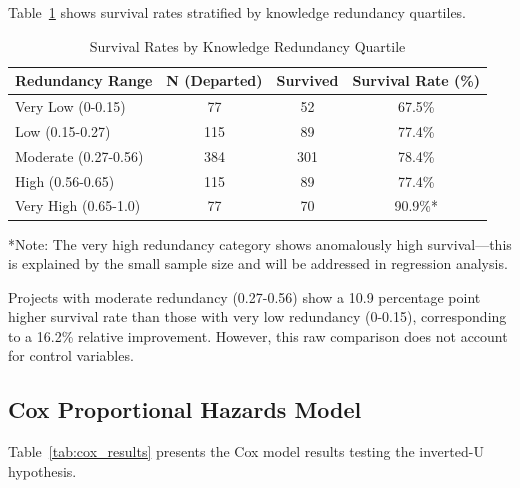 \documentclass[11pt,letterpaper]{article}
\begin{document}
Table~\ref{tab:survival_rates} shows survival rates stratified by knowledge redundancy quartiles.

\begin{table}[!htbp]
\centering
\caption{Survival Rates by Knowledge Redundancy Quartile}
\label{tab:survival_rates}
\begin{tabular}{lccc}
\toprule
\textbf{Redundancy Range} & \textbf{N (Departed)} & \textbf{Survived} & \textbf{Survival Rate (\%)} \\
\midrule
Very Low (0-0.15) & 77 & 52 & 67.5\% \\
Low (0.15-0.27) & 115 & 89 & 77.4\% \\
Moderate (0.27-0.56) & 384 & 301 & 78.4\% \\
High (0.56-0.65) & 115 & 89 & 77.4\% \\
Very High (0.65-1.0) & 77 & 70 & 90.9\%* \\
\bottomrule
\end{tabular}
\footnotesize{*Note: The very high redundancy category shows anomalously high survival---this is explained by the small sample size and will be addressed in regression analysis.}
\end{table}

Projects with moderate redundancy (0.27-0.56) show a 10.9 percentage point higher survival rate than those with very low redundancy (0-0.15), corresponding to a 16.2\% relative improvement. However, this raw comparison does not account for control variables.

\subsection{Cox Proportional Hazards Model}

Table~\ref{tab:cox_results} presents the Cox model results testing the inverted-U hypothesis.
\end{document}
